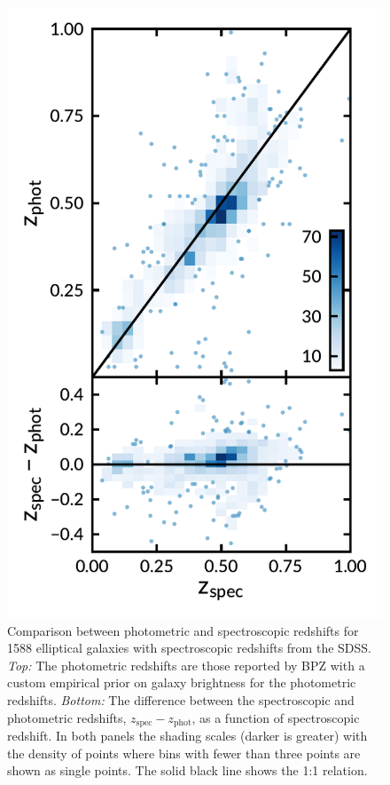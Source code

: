 \documentclass[apj, revtex4-1]{emulateapj}
\begin{document}
\begin{figure}
	\includegraphics[width=\columnwidth]{figures/specVSphot.pdf}
	\caption{Comparison between photometric and spectroscopic redshifts for 1588 elliptical galaxies with spectroscopic redshifts from the SDSS. \textit{Top:} The photometric redshifts are those reported by BPZ with a custom empirical prior on galaxy brightness for the photometric redshifts. \textit{Bottom:} The difference between the spectroscopic and photometric redshifts, $z_\mathrm{spec} - z_\mathrm{phot}$, as a function of spectroscopic redshift. In both panels the shading scales (darker is greater) with the density of points where bins with fewer than three points are shown as single points. The solid black line shows the 1:1 relation.}
	\label{fig:photozspecz}
\end{figure}
\end{document}
